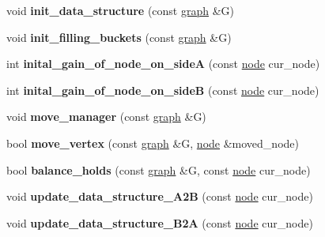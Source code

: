 \begin{DoxyCompactItemize}
\item 
\mbox{\label{classfm__partition_a9aa27d4c97616c0fdbd00d11dc83bc0b}} 
void {\bfseries init\+\_\+data\+\_\+structure} (const \mbox{\hyperlink{classgraph}{graph}} \&G)
\item 
\mbox{\label{classfm__partition_ac510befe1837c646a260a14c110d7a79}} 
void {\bfseries init\+\_\+filling\+\_\+buckets} (const \mbox{\hyperlink{classgraph}{graph}} \&G)
\item 
\mbox{\label{classfm__partition_a50c61b9d27e83a98e2e04a47b51670b6}} 
int {\bfseries inital\+\_\+gain\+\_\+of\+\_\+node\+\_\+on\+\_\+sideA} (const \mbox{\hyperlink{classnode}{node}} cur\+\_\+node)
\item 
\mbox{\label{classfm__partition_aa217da6a3c8a736e9e51aa348c951501}} 
int {\bfseries inital\+\_\+gain\+\_\+of\+\_\+node\+\_\+on\+\_\+sideB} (const \mbox{\hyperlink{classnode}{node}} cur\+\_\+node)
\item 
\mbox{\label{classfm__partition_a91572409b30f0967ea3782079f69b1bb}} 
void {\bfseries move\+\_\+manager} (const \mbox{\hyperlink{classgraph}{graph}} \&G)
\item 
\mbox{\label{classfm__partition_ac1167c6595a9f582ae98c9f555029d9b}} 
bool {\bfseries move\+\_\+vertex} (const \mbox{\hyperlink{classgraph}{graph}} \&G, \mbox{\hyperlink{classnode}{node}} \&moved\+\_\+node)
\item 
\mbox{\label{classfm__partition_a6dc702df474c4ce60e80b3e5a93b7f4d}} 
bool {\bfseries balance\+\_\+holds} (const \mbox{\hyperlink{classgraph}{graph}} \&G, const \mbox{\hyperlink{classnode}{node}} cur\+\_\+node)
\item 
\mbox{\label{classfm__partition_a8bd7f2715334e9ec95da8001117fdde5}} 
void {\bfseries update\+\_\+data\+\_\+structure\+\_\+\+A2B} (const \mbox{\hyperlink{classnode}{node}} cur\+\_\+node)
\item 
\mbox{\label{classfm__partition_a783174f29d49e7e1ae7f6cf71faa82fb}} 
void {\bfseries update\+\_\+data\+\_\+structure\+\_\+\+B2A} (const \mbox{\hyperlink{classnode}{node}} cur\+\_\+node)

\end{DoxyCompactItemize}
